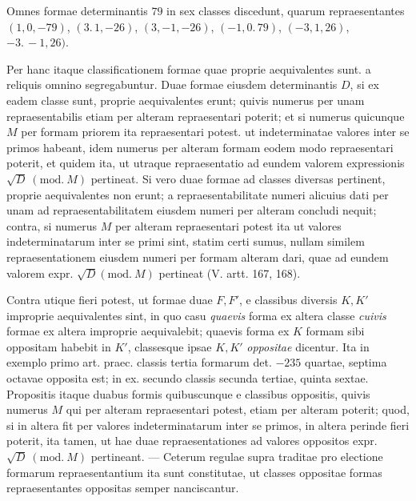 Omnes formae determinantis $79$ in sex classes discedunt, quarum repraesentantes
$(1,0,-79)$, $(3.\,1,-26)$, $(3,-1,-26)$, $(-1,0.\,79)$,
$(-3,1,26)$, $-3.\,-1,26)$.

Per hanc itaque classificationem formae quae proprie aequivalentes sunt. a reliquis
omnino segregabuntur. Duae formae eiusdem determinantis $D$, si ex eadem classe
sunt, proprie aequivalentes erunt; quivis numerus per unam repraesentabilis etiam
per alteram repraesentari poterit; et si numerus quicunque $M$ per formam priorem
ita repraesentari potest. ut indeterminatae valores inter se
primos habeant, idem numerus per alteram formam eodem modo repraesentari poterit,
et quidem ita, ut utraque repraesentatio ad eundem valorem expressionis
$\sqrt{D}\ (\mathrm{mod.}\ M)$ pertineat. Si vero duae formae ad classes diversas
pertinent, proprie aequivalentes non erunt; a repraesentabilitate numeri alicuius
dati per unam ad repraesentabilitatem eiusdem numeri per alteram concludi nequit;
contra, si numerus $M$ per alteram repraesentari potest ita ut valores
indeterminatarum inter se primi sint, statim certi sumus, nullam similem
repraesentationem eiusdem numeri per formam alteram dari, quae ad eundem valorem
expr. $\sqrt{D}(\mathrm{mod.}\ M)$ pertineat (V. artt. 167, 168).

Contra utique fieri potest, ut formae duae $F,F'$, e classibus diversis $K,K'$
improprie aequivalentes sint, in quo casu \textit{quaevis} forma ex altera classe
\textit{cuivis} formae ex altera improprie aequivalebit; quaevis forma ex $K$
formam sibi oppositam habebit in $K'$, classesque ipsae $K,K'$ \textit{oppositae}
dicentur. Ita in exemplo primo art. praec. classis tertia formarum det. $-235$
quartae, septima octavae opposita est; in ex. secundo classis secunda tertiae,
quinta sextae. Propositis itaque duabus formis quibuscunque e classibus oppositis,
quivis numerus $M$ qui per alteram repraesentari potest, etiam per alteram
poterit; quod, si in altera fit per valores indeterminatarum inter se primos,
in altera perinde fieri poterit, ita tamen, ut hae duae repraesentationes ad valores
oppositos expr. $\sqrt{D}\ (\mathrm{mod.}\ M)$ pertineant. --- Ceterum regulae
supra traditae pro electione formarum repraesentantium ita sunt constitutae,
ut classes oppositae formas repraesentantes oppositas semper nanciscantur.

